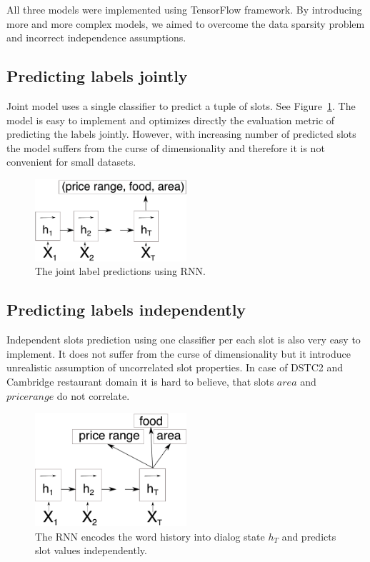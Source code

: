 \documentclass{itatnew}
\def\todo#1{\textcolor{purple}{todo: \textit{#1}}}
\begin{document}
All three models were implemented using TensorFlow\cite{abaditensorflow} framework. By introducing more and more complex models, we aimed to overcome the data sparsity problem and incorrect independence assumptions.

\subsection{Predicting labels jointly}
\label{sec:joint}
Joint model uses a single classifier to predict a tuple of slots. 
See Figure~\ref{fig:encjoint}.
The model is easy to implement and optimizes directly the evaluation metric of predicting the labels jointly.
However, with increasing number of predicted slots the model suffers from the curse of dimensionality and therefore it is not convenient for small datasets.
\begin{figure}
\includegraphics[width=0.5\textwidth]{encoder_joint}
\caption{The joint label predictions using RNN.}
\label{fig:encjoint}
\end{figure}

\subsection{Predicting labels independently}
\label{sec:indep}
Independent slots prediction using one classifier per each slot is also very easy to implement.
It does not suffer from the curse of dimensionality but it introduce unrealistic assumption of uncorrelated slot properties.
In case of DSTC2 and Cambridge restaurant domain it is hard to believe, that slots $area$ and $price range$ do not correlate.
\begin{figure}
\includegraphics[width=0.5\textwidth]{encoder}
\caption{The RNN encodes the word history into dialog state $h_T$ and predicts slot values independently.}
\label{fig:encind}
\end{figure}
\end{document}
